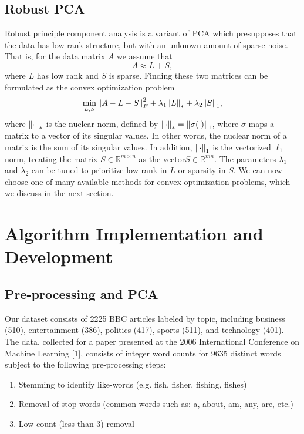 \documentclass[12pt]{article}
\newcommand{\R}{\mathbb{R}}
\begin{document}
\subsection{Robust PCA}
Robust principle component analysis is a variant of PCA which presupposes that the data has low-rank structure, but with an unknown amount of sparse noise. That is, for the data matrix $A$ we assume that 
\begin{equation}  A \approx L + S, \end{equation}
where $L$ has low rank and $S$ is sparse. Finding these two matrices can be formulated as the convex optimization problem
\begin{align}
\min_{L,S} \norm{A-L-S}_{F}^2 + \lambda_1 \norm{L}_* + \lambda_2 \norm{S}_1,
\label{eq:robust_obj}
\end{align}
where $\norm{\cdot}_*$ is the nuclear norm, defined by $\norm{\cdot}_* = \norm{\sigma(\cdot)}_1$, where $\sigma$ maps a matrix to a vector of its singular values. In other words, the nuclear norm of a matrix is the sum of its singular values. In addition, $\norm{\cdot}_1$ is the vectorized $\ell_1$ norm, treating the matrix $S \in \R^{m \times n}$ as the vector$S \in \R^{mn}.$ The parameters $\lambda_1$ and $\lambda_2$ can be tuned to prioritize low rank in $L$ or sparsity in $S.$ We can now choose one of many available methods for convex optimization problems, which we discuss in the next section. 

\section{Algorithm Implementation and Development}

\subsection{Pre-processing and PCA}

Our dataset consists of 2225 BBC articles labeled by topic, including business (510), entertainment (386), politics (417), sports (511), and technology (401). The data, collected for a paper presented at the 2006 International Conference on Machine Learning [1], consists of integer word counts for 9635 distinct words subject to the following pre-processing steps:
\newpage
\begin{enumerate}
\item Stemming to identify like-words (e.g. fish, fisher, fishing, fishes)
\item Removal of stop words (common words such as: a, about, am, any, are, etc.)
\item Low-count (less than 3) removal
\end{enumerate}
\end{document}
